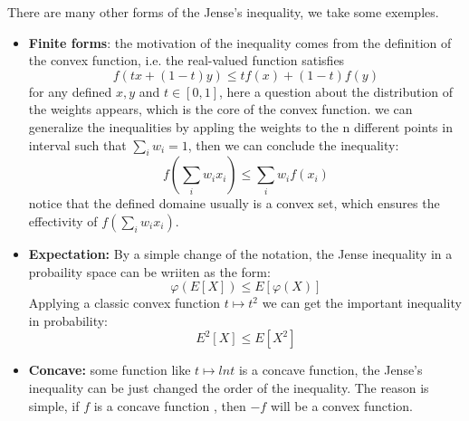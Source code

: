 \documentclass[en,geye,blue,normal,12pt,bibend=bibtex]{elegantnote}
\begin{document}
\begin{remark}
    There are many other forms of the Jense's inequality, we take some exemples.
    \begin{itemize}
        \item \textbf{Finite forms}: the motivation of the inequality comes from the definition of the convex function, i.e. the real-valued function satisfies
        \[f(tx+(1-t)y) \leq tf(x) + (1-t)f(y)\]
        for any defined \(x,y\) and \(t \in [0,1]\), here a question about the distribution of the weights appears, which is the core of the convex function. we can generalize the inequalities by appling the weights to the n different points in interval such that \(\sum_i w_i =1\), then we can conclude the inequality:
        \[f(\sum_i w_i x_i) \leq \sum_i w_i f(x_i)\]
        notice that the defined domaine usually is a convex set, which ensures the effectivity of \(f(\sum_i w_i x_i)\). 

        \item \textbf{Expectation:} By a simple change of the notation, the Jense inequality in a probaility space can be wriiten as the form:
        \[\varphi(E[X]) \leq E[\varphi(X)]\]
        Applying a classic convex function \(t \mapsto t^2\) we can get the important inequality in probability:
        \[E^2[X] \leq E[X^2]\]
        \item \textbf{Concave:} some function like \(t \mapsto lnt\) is a concave function, the Jense's inequality can be just changed the order of the inequality. The reason is simple, if \(f\) is a concave function , then \(-f\) will be a convex function.
    \end{itemize}
\end{remark}
\end{document}
